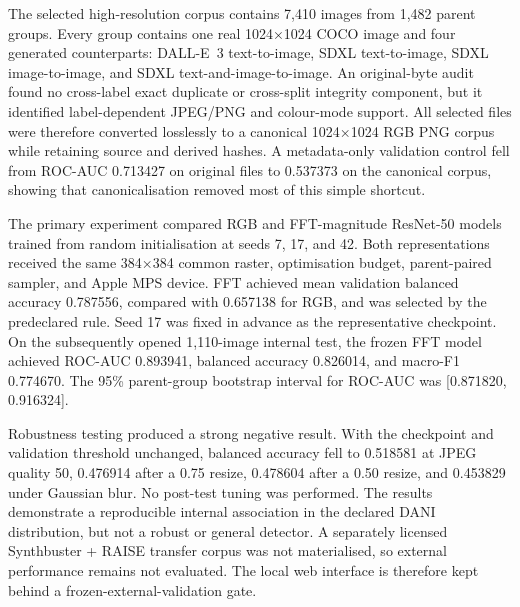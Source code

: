 \documentclass[12pt,a4paper]{article}
\begin{document}
The selected high-resolution corpus contains 7,410 images from 1,482 parent groups. Every group
contains one real 1024×1024 COCO image and four generated counterparts: DALL-E~3 text-to-image,
SDXL text-to-image, SDXL image-to-image, and SDXL text-and-image-to-image. An original-byte audit
found no cross-label exact duplicate or cross-split integrity component, but it identified
label-dependent JPEG/PNG and colour-mode support. All selected files were therefore converted
losslessly to a canonical 1024×1024 RGB PNG corpus while retaining source and derived hashes. A
metadata-only validation control fell from ROC-AUC 0.713427 on original files to 0.537373 on the
canonical corpus, showing that canonicalisation removed most of this simple shortcut.

The primary experiment compared RGB and FFT-magnitude ResNet-50 models trained from random
initialisation at seeds 7, 17, and 42. Both representations received the same 384×384 common raster,
optimisation budget, parent-paired sampler, and Apple MPS device. FFT achieved mean validation
balanced accuracy 0.787556, compared with 0.657138 for RGB, and was selected by the predeclared
rule. Seed 17 was fixed in advance as the representative checkpoint. On the subsequently opened
1,110-image internal test, the frozen FFT model achieved ROC-AUC 0.893941, balanced accuracy
0.826014, and macro-F1 0.774670. The 95\% parent-group bootstrap interval for ROC-AUC was
[0.871820, 0.916324].

Robustness testing produced a strong negative result. With the checkpoint and validation threshold
unchanged, balanced accuracy fell to 0.518581 at JPEG quality 50, 0.476914 after a 0.75 resize,
0.478604 after a 0.50 resize, and 0.453829 under Gaussian blur. No post-test tuning was performed.
The results demonstrate a reproducible internal association in the declared DANI distribution,
but not a robust or general detector. A separately licensed Synthbuster + RAISE transfer corpus
was not materialised, so external performance remains not evaluated. The local web interface is
therefore kept behind a frozen-external-validation gate.
\end{document}

